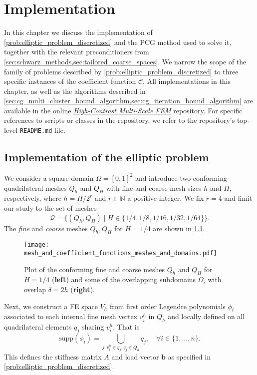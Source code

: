 \chapter{Implementation}\label{ch:implementation}
In this chapter we discuss the implementation of \cref{prob:elliptic_problem_discretized} and the PCG method used to solve it, together with the relevant preconditioners from \cref{sec:schwarz_methods,sec:tailored_coarse_spaces}. We narrow the scope of the family of problems described by \cref{prob:elliptic_problem_discretized} to three specific instances of the coefficient function $\mathcal{C}$. All implementations in this chapter, as well as the algorithms described in \cref{sec:cg_multi_cluster_bound_algorithm,sec:cg_iteration_bound_algorithm} are available in the online \href{https://github.com/PhilipSoliman/hcmsfem}{\textit{High-Contrast Multi-Scale FEM}} repository. For specific references to scripts or classes in the repository, we refer to the repository's top-level \texttt{README.md} file.

\section{Implementation of the elliptic problem}\label{sec:implementation_elliptic_problem}
We consider a square domain $\Omega = [0,1]^2$ and introduce two conforming quadrilateral meshes $Q_h$ and $Q_H$ with fine and coarse mesh sizes $h$ and $H$, respectively, where $h = H/2^r$ and $r\in\mathbb{N}$ a positive integer. We fix $r=4$ and limit our study to the set of meshes
\begin{equation}
    \mathcal{Q} = \{(Q_h, Q_H)\mid H\in\{1/4, 1/8, 1/16, 1/32, 1/64\}\}.
    \label{eq:meshes}
\end{equation}
The \textit{fine} and \textit{coarse} meshes $Q_h, Q_H$ for $H=1/4$ are shown in \cref{fig:mesh_4}.
\begin{figure}[H]
    \centering
    \texttt{[image: mesh\_and\_coefficient\_functions\_meshes\_and\_domains.pdf]}
    \caption{Plot of the conforming fine and coarse meshes $Q_h$ and $Q_H$ for $H=1/4$ (\textbf{left}) and some of the overlapping subdomains $\Omega_i$ with overlap $\delta = 2h$ (\textbf{right}).}
    \label{fig:mesh_4}
\end{figure}
Next, we construct a FE space $V_h$ from first order Legendre polynomials $\phi_i$ associated to each internal fine mesh vertex $v^h_i$ in $Q_h$ and locally defined on all quadrilateral elements $q_j$ sharing $v^h_i$. That is
\[
    \text{supp}(\phi_i) = \bigcup_{j: v^h_i\in q_j, q_j \in Q_h} q_j, \quad \forall i\in\{1,\ldots,n\}.
\]
This defines the stiffness matrix $A$ and load vector $\mathbf{b}$ as specified in \cref{prob:elliptic_problem_discretized}.

